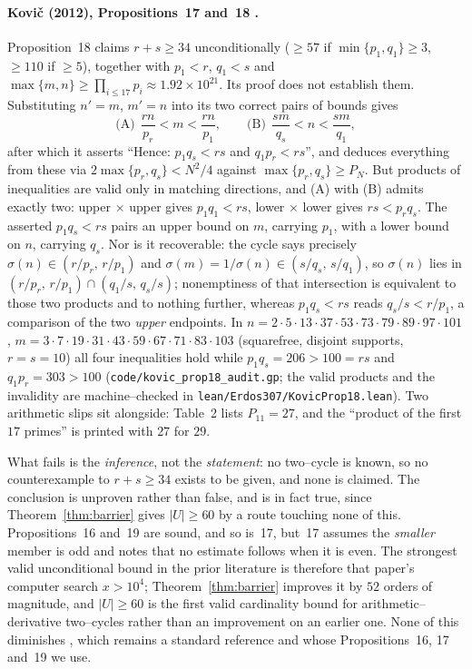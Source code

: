 \documentclass[11pt]{article}
\theoremstyle{definition}
\begin{document}
\paragraph{Kovi\v{c} (2012), Propositions~17 and~18 \cite{Kovic2012}.}
Proposition~18 claims $r+s\ge34$ unconditionally ($\ge57$ if $\min\{p_1,q_1\}\ge3$, $\ge110$ if
$\ge5$), together with $p_1<r$, $q_1<s$ and $\max\{m,n\}\ge\prod_{i\le17}p_i\approx1.92\times
10^{21}$. Its proof does not establish them. Substituting $n'=m$, $m'=n$ into its two correct pairs
of bounds gives
\[ \text{(A)}\ \ \frac{rn}{p_r}<m<\frac{rn}{p_1}, \qquad
   \text{(B)}\ \ \frac{sm}{q_s}<n<\frac{sm}{q_1}, \]
after which it asserts ``Hence: $p_1q_s<rs$ and $q_1p_r<rs$'', and deduces everything from these via
$2\max\{p_r,q_s\}<N^2/4$ against $\max\{p_r,q_s\}\ge P_N$. But products of inequalities are valid
only in matching directions, and (A) with (B) admits exactly two: upper$\,\times\,$upper gives
$p_1q_1<rs$, lower$\,\times\,$lower gives $rs<p_rq_s$. The asserted $p_1q_s<rs$ pairs an upper bound
on $m$, carrying $p_1$, with a lower bound on $n$, carrying $q_s$. Nor is it recoverable: the cycle
says precisely $\sigma(n)\in(r/p_r,\,r/p_1)$ and $\sigma(m)=1/\sigma(n)\in(s/q_s,\,s/q_1)$, so
$\sigma(n)$ lies in $(r/p_r,\,r/p_1)\cap(q_1/s,\,q_s/s)$; nonemptiness of that intersection is
equivalent to those two products and to nothing further, whereas $p_1q_s<rs$ reads $q_s/s<r/p_1$, a
comparison of the two \emph{upper} endpoints. In
$n=2\cdot5\cdot13\cdot37\cdot53\cdot73\cdot79\cdot89\cdot97\cdot101$,
$m=3\cdot7\cdot19\cdot31\cdot43\cdot59\cdot67\cdot71\cdot83\cdot103$ (squarefree, disjoint
supports, $r=s=10$) all four inequalities hold while $p_1q_s=206>100=rs$ and $q_1p_r=303>100$
(\texttt{code/kovic\_prop18\_audit.gp}; the valid products and the invalidity are machine--checked in
\texttt{lean/Erdos307/KovicProp18.lean}). Two arithmetic slips sit alongside: Table~2 lists
$P_{11}=27$, and the ``product of the first $17$ primes'' is printed with $27$ for $29$.

What fails is the \emph{inference}, not the \emph{statement}: no two--cycle is known, so no
counterexample to $r+s\ge34$ exists to be given, and none is claimed. The conclusion is unproven
rather than false, and is in fact true, since Theorem~\ref{thm:barrier} gives $|U|\ge60$ by a route
touching none of this. Propositions~16 and~19 are sound, and so is~17, but~17 assumes the
\emph{smaller} member is odd and \cite{Kovic2012} notes that no estimate follows when it is even. The
strongest valid unconditional bound in the prior literature is therefore that paper's computer search
$x>10^4$; Theorem~\ref{thm:barrier} improves it by $52$ orders of magnitude, and $|U|\ge60$ is the
first valid cardinality bound for arithmetic--derivative two--cycles rather than an improvement on an
earlier one. None of this diminishes \cite{Kovic2012}, which remains a standard reference and whose
Propositions~16, 17 and~19 we use.
\end{document}
